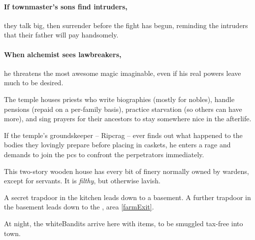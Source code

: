 \begin{multicols}{2}

\paragraph{If \gls{townmaster}'s sons find intruders,}
they talk big, then surrender before the fight has begun, reminding the intruders that their father will pay handsomely.

\citadelAlchemist

\showStdSpells

\label{citadel_alchemist}

\paragraph{When \gls{alchemist} sees lawbreakers,}
he threatens the most awesome magic imaginable, even if his real powers leave much to be desired.

\townmaster


The temple houses priests who write biographies (mostly for nobles), handle pensions (repaid on a per-family basis), practice starvation (so others can have more), and sing prayers for their ancestors to stay somewhere nice in the afterlife.

If the temple's groundskeeper -- Ripcrag -- ever finds out what happened to the bodies they lovingly prepare before placing in caskets, he enters a rage and demands to join the \glspl{pc} to confront the perpetrators immediately.



This two-story wooden house has every bit of finery normally owned by \glspl{warden}, except for servants.
It is \emph{filthy}, but otherwise lavish.

A secret trapdoor in the kitchen leads down to a basement.
A further trapdoor in the basement leads down to the , area \vref{farmExit}.

At night, the \gls{whiteBandits} arrive here with items, to be smuggled tax-free into \gls{town}.


\begin{boxtext}


\end{boxtext}
\end{multicols}
